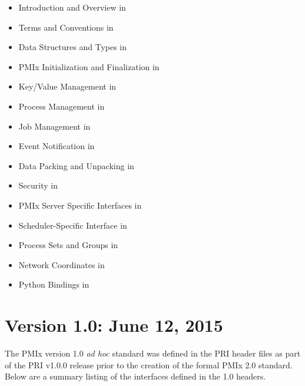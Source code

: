 \begin{itemize}
\item Introduction and Overview in 
\item Terms and Conventions in 
\item Data Structures and Types in 
\item \ac{PMIx} Initialization and Finalization in 
\item Key/Value Management in 
\item Process Management in 
\item Job Management in 
\item Event Notification in 
\item Data Packing and Unpacking in 
\item Security in 
\item \ac{PMIx} Server Specific Interfaces in 
\item Scheduler-Specific Interface in 
\item Process Sets and Groups in 
\item Network Coordinates in 
\item Python Bindings in 
\end{itemize}

\section{Version 1.0: June 12, 2015}

\par
The \ac{PMIx} version 1.0 \textit{ad hoc} standard was defined in the \acf{PRI} header files as part of the \ac{PRI} v1.0.0 release prior to the creation of the formal \ac{PMIx} 2.0 standard.
Below are a summary listing of the interfaces defined in the 1.0 headers.


